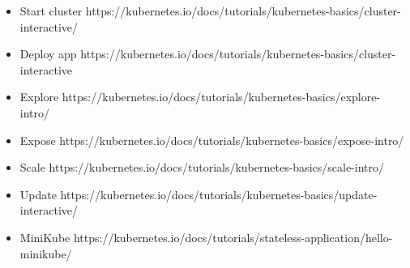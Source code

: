 \begin{itemize}
\item
  Start cluster
  https://kubernetes.io/docs/tutorials/kubernetes-basics/cluster-interactive/
\item
  Deploy app
  https://kubernetes.io/docs/tutorials/kubernetes-basics/cluster-interactive
\item
  Explore
  https://kubernetes.io/docs/tutorials/kubernetes-basics/explore-intro/
\item
  Expose
  https://kubernetes.io/docs/tutorials/kubernetes-basics/expose-intro/
\item
  Scale
  https://kubernetes.io/docs/tutorials/kubernetes-basics/scale-intro/
\item
  Update
  https://kubernetes.io/docs/tutorials/kubernetes-basics/update-interactive/
\item
  MiniKube
  https://kubernetes.io/docs/tutorials/stateless-application/hello-minikube/
\end{itemize}
